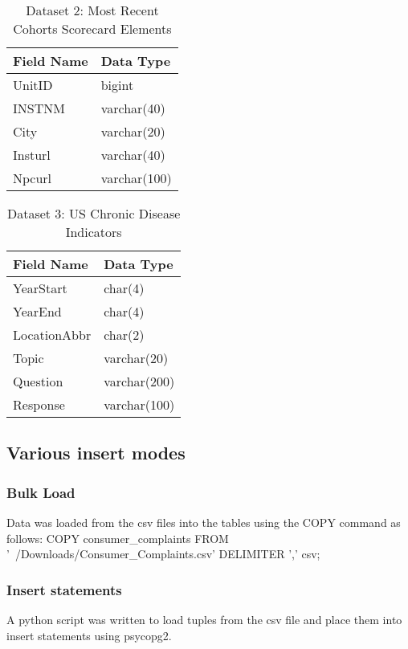 \documentclass[10pt]{article}
\begin{document}
\begin{table}[h!]
\centering
\caption{Dataset 2: Most Recent Cohorts Scorecard Elements}
  \label{tab:table5}
  \vspace{5mm}
  \begin{tabular}{|p{4cm}|p{4cm}|}
  \hline
  Field Name & Data Type\\
  \hline
  UnitID & bigint\\
  \hline
  INSTNM & varchar(40)\\
  \hline
  City & varchar(20)\\
  \hline
  Insturl & varchar(40)\\
  \hline
  Npcurl & varchar(100)\\
  \hline
  \end{tabular}
\end{table}

\begin{table}[h!]
\centering
\caption{Dataset 3: US Chronic Disease Indicators}
  \label{tab:table}
  \vspace{5mm}
  \begin{tabular}{|p{4cm}|p{4cm}|}
  \hline
  Field Name & Data Type\\
  \hline
  YearStart & char(4)\\
  \hline
  YearEnd & char(4)\\
  \hline
  LocationAbbr & char(2)\\
  \hline
  Topic & varchar(20)\\
  \hline
  Question & varchar(200)\\
  \hline
  Response & varchar(100)\\
  \hline
  \end{tabular}
\end{table}
\subsection{Various insert modes}
\subsubsection{Bulk Load}
Data was loaded from the csv files into the tables using the COPY command as follows:\linebreak
COPY consumer\_complaints FROM '~/Downloads/Consumer\_Complaints.csv' DELIMITER ',' csv;
\subsubsection{Insert statements}
A python script was written to load tuples from the csv file and place them into insert statements using psycopg2.
\end{document}
